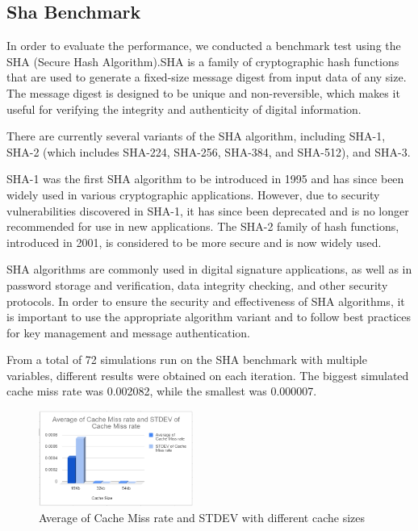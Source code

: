 \documentclass[conference]{IEEEtran}
\begin{document}
\subsection{Sha Benchmark}
In order to evaluate the performance, we conducted a benchmark test using the SHA (Secure Hash Algorithm).SHA is a family of cryptographic hash functions that are used to generate a fixed-size message digest from input data of any size. The message digest is designed to be unique and non-reversible, which makes it useful for verifying the integrity and authenticity of digital information.

There are currently several variants of the SHA algorithm, including SHA-1, SHA-2 (which includes SHA-224, SHA-256, SHA-384, and SHA-512), and SHA-3.

SHA-1 was the first SHA algorithm to be introduced in 1995 and has since been widely used in various cryptographic applications. However, due to security vulnerabilities discovered in SHA-1, it has since been deprecated and is no longer recommended for use in new applications. The SHA-2 family of hash functions, introduced in 2001, is considered to be more secure and is now widely used.

SHA algorithms are commonly used in digital signature applications, as well as in password storage and verification, data integrity checking, and other security protocols. In order to ensure the security and effectiveness of SHA algorithms, it is important to use the appropriate algorithm variant and to follow best practices for key management and message authentication.

From a total of 72 simulations run on the SHA benchmark with multiple variables, different results were obtained on each iteration. The biggest simulated cache miss rate was 0.002082, while the smallest was 0.000007.

\begin{figure}[H]
    \centering
    \includegraphics[width=0.45\textwidth]{sha/sha_avg_cachesize.png}
    \caption{Average of Cache Miss rate and STDEV with different cache sizes}
\end{figure}
\end{document}
